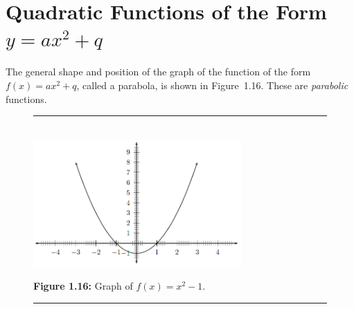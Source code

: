   
      \label{m39345*uid101}
            \section{ Quadratic Functions of the Form $y=a{x}^{2}+q$}
            \nopagebreak
        
        \label{m39345*id240272}The general shape and position of the graph of the function of the form \begin{math}f\left(x\right)=a{x}^{2}+q\end{math}, called a parabola, is shown in Figure~1.16. These are \textsl{parabolic} functions.\par 
        
    \setcounter{subfigure}{0}


	\begin{figure}[H] %
    \begin{center}
    \rule[.1in]{\figurerulewidth}{.005in} \\
        \label{m39345*uid102!!!underscore!!!media}\label{m39345*uid102!!!underscore!!!printimage}\includegraphics[width=300px]{col11306.imgs/m39345_MG10C11_013.png} %
        
      \vspace{2pt}
    \vspace{\rubberspace}\par \begin{cnxcaption}
	  \small \textbf{Figure 1.16: }Graph of \begin{math}f\left(x\right)={x}^{2}-1\end{math}.
	\end{cnxcaption}
      
    \vspace{.1in}
    \rule[.1in]{\figurerulewidth}{.005in} \\
        
    \end{center}

 \end{figure}   

